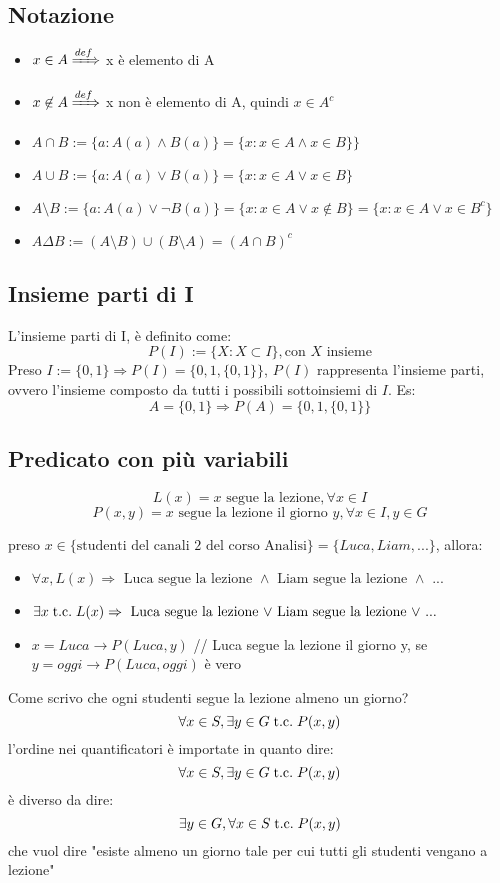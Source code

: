 \documentclass[a4paper,12pt]{article}
\begin{document}
	\subsection{Notazione}
	\begin{itemize}
		\item $x\in A \xRightarrow{def}$ x è elemento di A 
		\item $x\not \in A \xRightarrow{def}$ x non è elemento di A, quindi $x\in A^c$
		\item $A \cap B := \{a : A(a) \wedge B(a)\} = \{x : x \in A \wedge x \in B\} \}$
		\item $A \cup B := \{a : A(a) \vee B(a)\} = \{x : x \in A \vee x \in B\}$
		\item $A \setminus B := \{a : A(a) \vee \neg B(a)\} = \{x : x\in A \vee x \not \in B\} = \{x : x\in A \vee x \in B^c\}$
		\item $A \Delta B := (A \setminus B ) \cup (B \setminus A) = (A \cap B)^c$
	\end{itemize}
	
	\subsection{Insieme parti di I}
	L'insieme parti di I, è definito come:
	\[
	P(I) := \{X : X \subset I\}, \text{con $X$ insieme}
	\]
	Preso $I := \{0, 1\} \Rightarrow P(I) = \{0, 1, \{0, 1\}\}$, $P(I)$ rappresenta l'insieme parti, ovvero l'insieme composto da tutti i possibili sottoinsiemi di $I$.
	Es:
	\[A =\{0, 1\} \Rightarrow P(A) = \{0, 1, \{0, 1\}\}\]
	
	\subsection{Predicato con più variabili}
	\[L(x) = x \text{ segue la lezione}, \forall x \in I\]
	\[P(x, y) = x \text{ segue la lezione il giorno }y, \forall x\in I, y\in G\]
	
	preso $x \in \{\text{studenti del canali 2 del corso Analisi}\} = \{Luca, Liam, ...\}$, allora:
	\begin{itemize}
		\item $\forall x, L(x) \Rightarrow \text{ Luca segue la lezione $\wedge$ Liam segue la lezione $\wedge$ ... }$
		\item $\exists x \;\text{t.c.}\; L(x) \Rightarrow \text{ Luca segue la lezione $\vee$ Liam segue la lezione $\vee$ ... }$
		\item $x = Luca \rightarrow P(Luca, y)$ // Luca segue la lezione il giorno y, se $y = oggi \rightarrow P(Luca, oggi)$ è vero
	\end{itemize}
	Come scrivo che ogni studenti segue la lezione almeno un giorno?
	\[\forall x \in S, \exists y \in G \;\text{t.c.}\; P(x, y)\]
	l'ordine nei quantificatori è importate in quanto dire:
	\[\forall x \in S, \exists y \in G \;\text{t.c.}\; P(x, y)\]
	è diverso da dire:
	\[\exists y \in G, \forall x \in S\;\text{t.c.}\; P(x, y)\]
	che vuol dire "esiste almeno un giorno tale per cui tutti gli studenti vengano a lezione"
	
\end{document}
